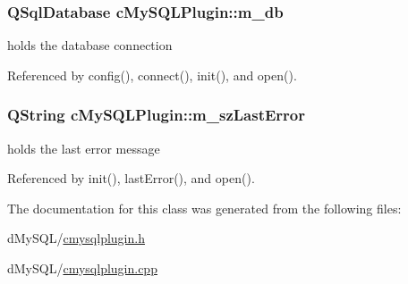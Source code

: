 \subsubsection[{\texorpdfstring{m\+\_\+db}{m_db}}]{\setlength{\rightskip}{0pt plus 5cm}Q\+Sql\+Database c\+My\+S\+Q\+L\+Plugin\+::m\+\_\+db\hspace{0.3cm}{\ttfamily [protected]}}\hypertarget{classc_my_s_q_l_plugin_ae8eac3baf1f720e5b36315a611a18d50}{}\label{classc_my_s_q_l_plugin_ae8eac3baf1f720e5b36315a611a18d50}
holds the database connection 

Referenced by config(), connect(), init(), and open().

\subsubsection[{\texorpdfstring{m\+\_\+sz\+Last\+Error}{m_szLastError}}]{\setlength{\rightskip}{0pt plus 5cm}Q\+String c\+My\+S\+Q\+L\+Plugin\+::m\+\_\+sz\+Last\+Error\hspace{0.3cm}{\ttfamily [protected]}}\hypertarget{classc_my_s_q_l_plugin_aa59160129f7a5c373fef1cfd0d8e281c}{}\label{classc_my_s_q_l_plugin_aa59160129f7a5c373fef1cfd0d8e281c}
holds the last error message 

Referenced by init(), last\+Error(), and open().



The documentation for this class was generated from the following files\+:\begin{DoxyCompactItemize}
\item 
d\+My\+S\+Q\+L/\hyperlink{cmysqlplugin_8h}{cmysqlplugin.\+h}\item 
d\+My\+S\+Q\+L/\hyperlink{cmysqlplugin_8cpp}{cmysqlplugin.\+cpp}\end{DoxyCompactItemize}

